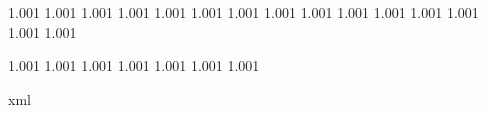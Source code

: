 




\chardef{}
\chardef{}

\newtoks\everywritestring

\def\writedirect  {\immediate\write\statuswrite}
\def\writeline    {\writedirect{}}
\def\writestring#1{\begingroup\the\everywritestring\writedirect{#1}\endgroup}

\ifx\normalmessage    \undefined \let\normalmessage         \message               \fi
\ifx\normalwritestatus\undefined \def\normalwritestatus#1#2{\writedirect{#1 : #2}} \fi


 {1.001}
   {1.001}
 {1.001}
   {1.001}
  {1.001}
    {1.001}
    {1.001}
     {1.001}
     {1.001}
   {1.001}
    {1.001}
  {1.001}
    {1.001}
    {1.001}
    {1.001}

 {1.001}
 {1.001}
 {1.001}
 {1.001}
 {1.001}
 {1.001}
 {1.001}

\startruntimeluacode
    \edef\asciia{}
    \edef\asciib{xml}
    \ifx\asciia\asciib %
        \long\def\writebanner  #1{\writestring  {<m t='banner'>#1</m>}}
        \long\def\writestatus#1#2{\writestring  {<m t='#1'>#2</m>}}
        \long\def\message      #1{\normalmessage{<m t='message'>#1</m>}}
    \else
        \let\writebanner\writestring
        \let\writestatus\normalwritestatus
        \let\message    \normalmessage
    \fi
\stopruntimeluacode


